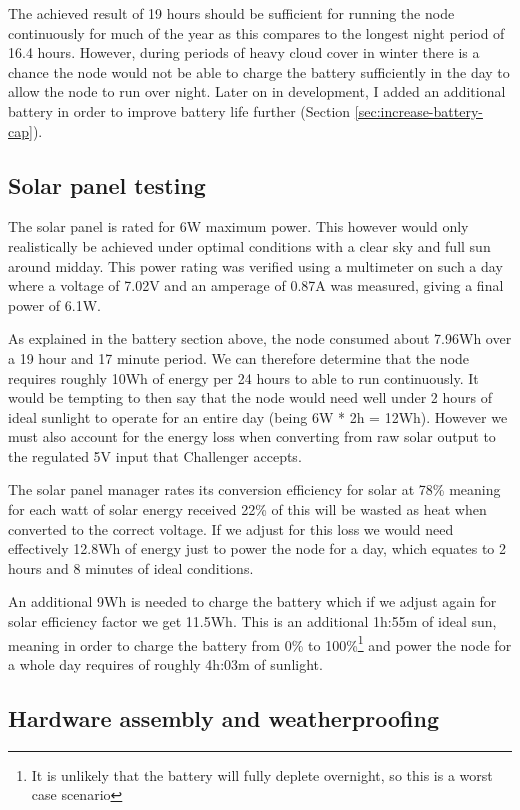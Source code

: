 The achieved result of 19 hours should be sufficient for running the node
continuously for much of the year as this compares to the longest night period
of 16.4 hours. However, during periods of heavy cloud cover in winter there is a
chance the node would not be able to charge the battery sufficiently in the day
to allow the node to run over night. Later on in development, I added an
additional battery in order to improve battery life further (Section
\ref{sec:increase-battery-cap}).

\subsection{Solar panel testing}\label{sec:solar-tests}

The solar panel is rated for 6W maximum power. This however would only
realistically be achieved under optimal conditions with a clear sky and full sun
around midday. This power rating was verified using a multimeter on such a day
where a voltage of 7.02V and an amperage of 0.87A was measured, giving a final
power of 6.1W.

As explained in the battery section above, the node consumed about 7.96Wh over a
19 hour and 17 minute period. We can therefore determine that the node requires
roughly 10Wh of energy per 24 hours to able to run continuously. It would be
tempting to then say that the node would need well under 2 hours of ideal
sunlight to operate for an entire day (being 6W * 2h = 12Wh). However we must
also account for the energy loss when converting from raw solar output to the
regulated 5V input that Challenger accepts.

The solar panel manager rates its conversion efficiency for solar at 78\%
meaning for each watt of solar energy received 22\% of this will be wasted as
heat when converted to the correct voltage. If we adjust for this loss we would
need effectively 12.8Wh of energy just to power the node for a day, which
equates to 2 hours and 8 minutes of ideal conditions.

An additional 9Wh is needed to charge the battery which if we adjust again for
solar efficiency factor we get 11.5Wh. This is an additional 1h:55m of ideal
sun, meaning in order to charge the battery from 0\% to 100\%\footnote{It is
unlikely that the battery will fully deplete overnight, so this is a worst case
scenario} and power the node for a whole day requires of roughly 4h:03m of
sunlight.

\subsection{Hardware assembly and weatherproofing}

